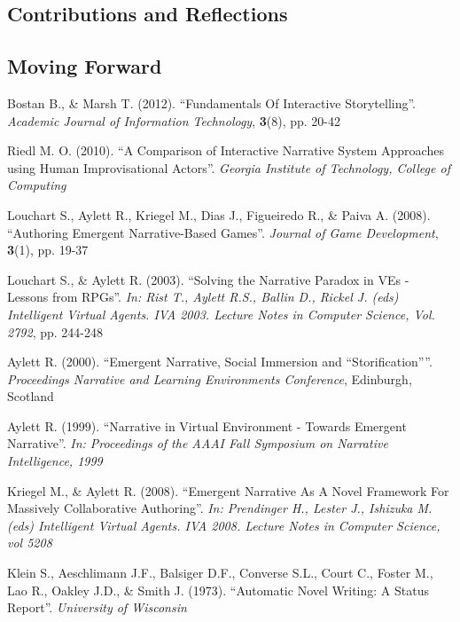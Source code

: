 \documentclass{sig-alternate-05-2015}
\begin{document}
\subsection{Contributions and Reflections}
\subsection{Moving Forward}

\newpage
{}

\begin{thebibliography}{20}

Bostan B., \& Marsh T. (2012). 
``Fundamentals Of Interactive Storytelling''. 
\textit{Academic Journal of Information Technology}, \textbf{3}(8), pp. 20-42

Riedl M. O. (2010). 
``A Comparison of Interactive Narrative System Approaches using Human Improvisational Actors''.
\textit{Georgia Institute of Technology, College of Computing}

Louchart S., Aylett R., Kriegel M., Dias J., Figueiredo R., \& Paiva A. (2008).
``Authoring Emergent Narrative-Based Games''.
\textit{Journal of Game Development}, \textbf{3}(1), pp. 19-37

Louchart S., \& Aylett R. (2003).
``Solving the Narrative Paradox in VEs - Lessons from RPGs''.
\textit{In: Rist T., Aylett R.S., Ballin D., Rickel J. (eds) Intelligent Virtual Agents. IVA 2003. Lecture Notes in Computer Science, Vol. 2792}, pp. 244-248

Aylett R. (2000).
``Emergent Narrative, Social Immersion and ``Storification''''.
\textit{Proceedings Narrative and Learning Environments Conference}, Edinburgh, Scotland

Aylett R. (1999).
``Narrative in Virtual Environment - Towards Emergent Narrative''.
\textit{In: Proceedings of the AAAI Fall Symposium on Narrative Intelligence, 1999}

Kriegel M., \& Aylett R. (2008).
``Emergent Narrative As A Novel Framework For Massively Collaborative Authoring''.
\textit{In: Prendinger H., Lester J., Ishizuka M. (eds) Intelligent Virtual Agents. IVA 2008. Lecture Notes in Computer Science, vol 5208}

Klein S., Aeschlimann J.F., Balsiger D.F., Converse S.L., Court C., Foster M., Lao R., Oakley J.D., \& Smith J. (1973).
``Automatic Novel Writing: A Status Report''.
\textit{University of Wisconsin}


\end{thebibliography}
\end{document}
